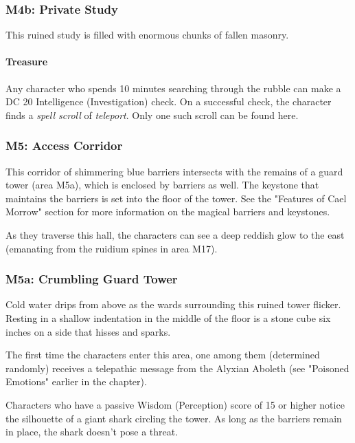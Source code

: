 \documentclass[a4paper, 11pt, bg=full, twocolumn, nooutline]{dndbook}
\begin{document}
\subsubsection{M4b: Private Study}

This ruined study is filled with enormous chunks of fallen masonry.

\paragraph{Treasure}

Any character who spends 10 minutes searching through the rubble can make a DC 20 Intelligence (Investigation) check. On a successful check, the character finds a \textit{spell scroll} of \textit{teleport}. Only one such scroll can be found here.

\subsubsection{M5: Access Corridor}

This corridor of shimmering blue barriers intersects with the remains of a guard tower (area M5a), which is enclosed by barriers as well. The keystone that maintains the barriers is set into the floor of the tower. See the "Features of Cael Morrow" section for more information on the magical barriers and keystones.

As they traverse this hall, the characters can see a deep reddish glow to the east (emanating from the ruidium spines in area M17).

\subsubsection{M5a: Crumbling Guard Tower}

\begin{DndReadAloud}
Cold water drips from above as the wards surrounding this ruined tower flicker. Resting in a shallow indentation in the middle of the floor is a stone cube six inches on a side that hisses and sparks.
\end{DndReadAloud}

The first time the characters enter this area, one among them (determined randomly) receives a telepathic message from the Alyxian Aboleth (see "Poisoned Emotions" earlier in the chapter).

Characters who have a passive Wisdom (Perception) score of 15 or higher notice the silhouette of a giant shark circling the tower. As long as the barriers remain in place, the shark doesn't pose a threat.
\end{document}

